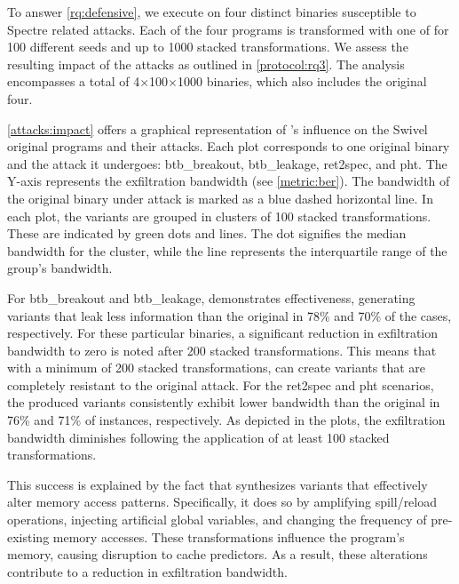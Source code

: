 
To answer \ref{rq:defensive}, we execute \tool on four distinct binaries \wasm susceptible to Spectre related attacks. Each of the four programs is transformed with one of for 100 different seeds and up to 1000 stacked transformations. 
We assess the resulting impact of the attacks as outlined in \ref{protocol:rq3}. 
The  analysis encompasses a total of 4$\times$100$\times$1000 binaries, which also includes the original four.

\autoref{attacks:impact} offers a graphical representation of \tool's influence on the Swivel original programs and their attacks. 
Each plot corresponds to one original \wasm binary and the attack it undergoes: btb\_breakout, btb\_leakage, ret2spec, and pht.
The Y-axis represents the exfiltration bandwidth (see \autoref{metric:ber}). 
The bandwidth of the original binary under attack is marked as a blue dashed horizontal line.
In each plot, the variants are grouped in clusters of 100 stacked transformations. 
These are indicated by green dots and lines. 
The dot signifies the median bandwidth for the cluster, while the line represents the interquartile range of the group's bandwidth.



For btb\_breakout and btb\_leakage, \tool demonstrates effectiveness, generating variants that leak less information than the original in 78\% and 70\% of the cases, respectively.
For these particular binaries, a significant reduction in exfiltration bandwidth to zero is noted after 200 stacked transformations.
This means that with a minimum of 200 stacked transformations, \tool can create variants that are completely resistant to the original attack.
For the ret2spec and pht scenarios, the produced variants consistently exhibit lower bandwidth than the original in 76\% and 71\% of instances, respectively.
As depicted in the plots, the exfiltration bandwidth diminishes following the application of at least  100 stacked transformations.

This success is explained by the fact that \tool synthesizes variants that effectively alter memory access patterns. 
Specifically, it does so by amplifying spill/reload operations, injecting artificial global variables, and changing the frequency of pre-existing memory accesses. 
These transformations influence the \wasm program's memory, causing disruption to cache predictors. 
As a result, these alterations contribute to a reduction in exfiltration bandwidth.


